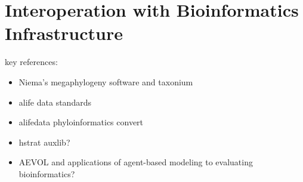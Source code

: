 \section{Interoperation with Bioinformatics Infrastructure}
\label{sec:interoperation}

key references:
\begin{itemize}
\item Niema's megaphylogeny software \citep{moshiri2025compacttree, moshiri2020treeswift} and taxonium \citep{sanderson2022taxonium}
\item alife data standards \citep{lalejini2019data}
\item alifedata phyloinformatics convert \citep{moreno2024apc}
\item hstrat auxlib? \citep{moreno2022hstrat}
\item AEVOL \citep{daudey2024aevol} and applications of agent-based modeling to evaluating bioinformatics?
\end{itemize}


